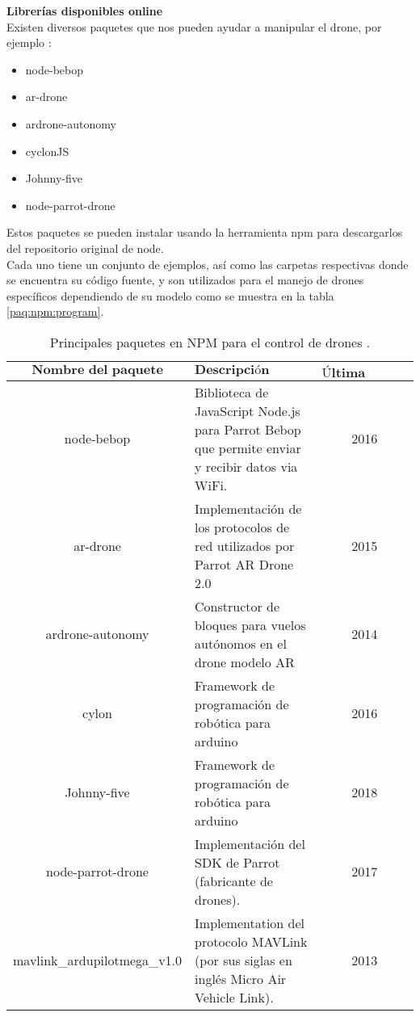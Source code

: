 \textbf{Librerías disponibles online} \\
Existen diversos paquetes que nos pueden ayudar a manipular el drone, por 
ejemplo \cite{npm_program}:

\begin{itemize}
	\item node-bebop
	\item ar-drone
	\item ardrone-autonomy
	\item cyclonJS
	\item Johnny-five
	\item node-parrot-drone
\end{itemize}

Estos paquetes se pueden instalar usando la herramienta npm para descargarlos 
del repositorio original de node. \\
Cada uno tiene un conjunto de ejemplos, así como las carpetas respectivas donde 
se encuentra su código fuente, y son utilizados para el manejo de drones 
específicos dependiendo de su modelo como se muestra en la tabla 
\ref{paq:npm:program}.

\begin{table}[H]
	\centering 
	\caption{Principales paquetes en NPM para el control de drones 
		\cite{npm_program}.}
	\label{paq:npm:drone}
	\begin{tabular*}{0.9\textwidth}{@{\extracolsep{\fill}} |c|l|c|}
		\hline
		$\textbf{Nombre del paquete}$ & $\textbf{Descripción}$ &
		$\textbf{Última actualización}$
		\\\hline \hline
		\parbox[t]{4cm}{node-bebop} &
		\parbox[t]{3cm}{
		Biblioteca de JavaScript Node.js para Parrot Bebop que permite 
		enviar y recibir datos via WiFi.
		} & 
		\parbox[t]{5.5cm}{2016} \\\hline
		\parbox[t]{4cm}{ar-drone} &
		\parbox[t]{3cm}{Implementación de los protocolos de red 
		utilizados por Parrot AR Drone 2.0
		} &
		\parbox[t]{5.5cm}{2015} \\\hline
		\parbox[t]{4cm}{ardrone-autonomy} &
		\parbox[t]{3cm}{Constructor de bloques para vuelos autónomos en 
		el drone modelo AR} &
		\parbox[t]{5.5cm}{2014} \\\hline
		\parbox[t]{4cm}{cylon} &
		\parbox[t]{3cm}{Framework de programación de robótica para 
		arduino
		} &
		\parbox[t]{5.5cm}{2016} \\\hline
		\parbox[t]{4cm}{Johnny-five} &
		\parbox[t]{3cm}{Framework de programación de robótica para 
		arduino
		} &
		\parbox[t]{5.5cm}{2018} \\\hline
		\parbox[t]{4cm}{node-parrot-drone} &
		\parbox[t]{3cm}{Implementación del SDK de Parrot (fabricante de 
		drones).
		} &
		\parbox[t]{5.5cm}{2017} \\\hline
		\parbox[t]{4cm}{mavlink{\_}ardupilotmega{\_}v1.0} &
		\parbox[t]{3cm}{Implementation del protocolo MAVLink (por sus 
		siglas en inglés Micro Air Vehicle Link).
		} &
		\parbox[t]{5.5cm}{2013} \\\hline
	\end{tabular*}
\end{table}

